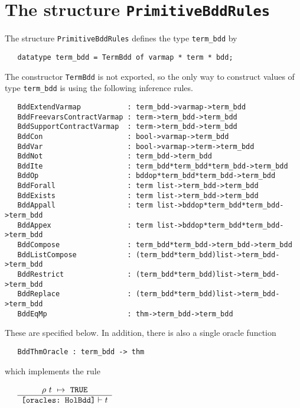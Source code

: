 \documentclass[12pt]{article}
\renewcommand{\t}[1]{\mbox{\tt #1}}
\newcommand{\ml}[1]{{\tt #1}}
\newcommand{\termbdd}[3]{\mbox{$#1~#2~\mapsto~#3$}}
\newcommand\termbddty{\texttt{term\_bdd}\xspace}
\begin{document}
\section{The structure \t{PrimitiveBddRules}}\label{PrimitiveBddRules}


The structure \ml{PrimitiveBddRules} defines the type \termbddty{} by

\begin{verbatim}
   datatype term_bdd = TermBdd of varmap * term * bdd;
\end{verbatim}

The constructor \t{TermBdd} is not exported, so the only way to construct
values of type \termbddty is using the following inference rules.

{\footnotesize\begin{verbatim}
   BddExtendVarmap           : term_bdd->varmap->term_bdd
   BddFreevarsContractVarmap : term->term_bdd->term_bdd
   BddSupportContractVarmap  : term->term_bdd->term_bdd
   BddCon                    : bool->varmap->term_bdd
   BddVar                    : bool->varmap->term->term_bdd
   BddNot                    : term_bdd->term_bdd
   BddIte                    : term_bdd*term_bdd*term_bdd->term_bdd
   BddOp                     : bddop*term_bdd*term_bdd->term_bdd
   BddForall                 : term list->term_bdd->term_bdd
   BddExists                 : term list->term_bdd->term_bdd
   BddAppall                 : term list->bddop*term_bdd*term_bdd->term_bdd
   BddAppex                  : term list->bddop*term_bdd*term_bdd->term_bdd
   BddCompose                : term_bdd*term_bdd->term_bdd->term_bdd
   BddListCompose            : (term_bdd*term_bdd)list->term_bdd->term_bdd
   BddRestrict               : (term_bdd*term_bdd)list->term_bdd->term_bdd
   BddReplace                : (term_bdd*term_bdd)list->term_bdd->term_bdd
   BddEqMp                   : thm->term_bdd->term_bdd
\end{verbatim}}

These are specified below. In addition, there is also a single oracle function


{\begin{verbatim}
   BddThmOracle : term_bdd -> thm
\end{verbatim}}

which implements the rule


\smallskip

\mbox{}~~~$\begin{array}{c}
\termbdd{\rho}{t}{\ml{TRUE}}
\\ \hline
\texttt{[oracles:~HolBdd]} \vdash t
\end{array}$
\end{document}
